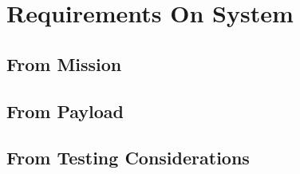 \chapter{Requirements On System}
\thispagestyle{fancy}


\section{From Mission}
\blindtext


\section{From Payload}
\blindtext


\section{From Testing Considerations}
\blindtext

